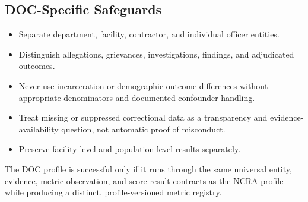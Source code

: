 \subsection{DOC-Specific Safeguards}

\begin{itemize}
  \item Separate department, facility, contractor, and individual officer
        entities.
  \item Distinguish allegations, grievances, investigations, findings, and
        adjudicated outcomes.
  \item Never use incarceration or demographic outcome differences without
        appropriate denominators and documented confounder handling.
  \item Treat missing or suppressed correctional data as a transparency and
        evidence-availability question, not automatic proof of misconduct.
  \item Preserve facility-level and population-level results separately.
\end{itemize}

The DOC profile is successful only if it runs through the same universal
entity, evidence, metric-observation, and score-result contracts as the NCRA
profile while producing a distinct, profile-versioned metric registry.
